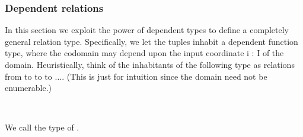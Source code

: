\subsubsection{Dependent relations}\label{dependent-relations}

In this section we exploit the power of dependent types to define a completely general relation type. Specifically, we let the tuples inhabit a dependent function type, where the codomain may depend upon the input coordinate \ab i \as : \ab I of the domain. Heuristically, think of the inhabitants of the following type as relations from   to   to   to $\ldots$. (This is just for intuition since the domain  need not be enumerable.)
\ccpad
\begin{code}%
\>[0]\AgdaSpace{}%
\AgdaSymbol{:}\AgdaSpace{}%
\AgdaSymbol{(}\AgdaSpace{}%
\AgdaSymbol{:}\AgdaSpace{}%
\AgdaSpace{}%
\AgdaSymbol{)(}\AgdaSpace{}%
\AgdaSymbol{:}\AgdaSpace{}%
\AgdaSpace{}%
\AgdaSpace{}%
\AgdaSpace{}%
\AgdaSymbol{)(}\AgdaSpace{}%
\AgdaSymbol{:}\AgdaSpace{}%
\AgdaSymbol{)}\AgdaSpace{}%
\AgdaSpace{}%
\AgdaSpace{}%
\AgdaSpace{}%
\AgdaSpace{}%
\AgdaSpace{}%
\AgdaSpace{}%
\AgdaSpace{}%
\<%
\\
\>[0]\AgdaSpace{}%
\AgdaSpace{}%
\AgdaSpace{}%
\AgdaSpace{}%
\AgdaSymbol{=}\AgdaSpace{}%
\AgdaSpace{}%
\AgdaSpace{}%
\AgdaSpace{}%
\AgdaSpace{}%
\<%
\end{code}
\ccpad
We call  the type of .


